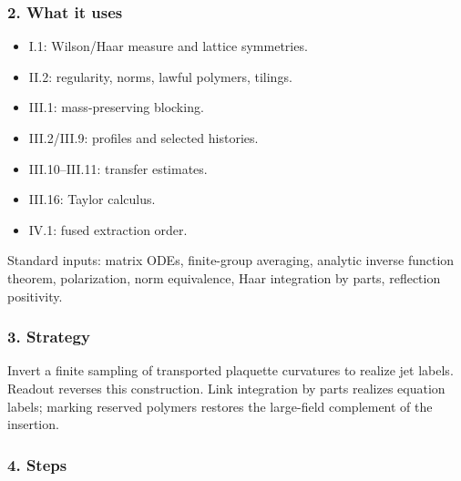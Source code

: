\documentclass[
  letterpaper,
  11pt]{article}
\providecommand{\tightlist}{%
  \setlength{\itemsep}{0pt}\setlength{\parskip}{0pt}}
\begin{document}
\subsubsection{2. What it uses}\label{what-it-uses-1}

\begin{itemize}
\tightlist
\item
  I.1: Wilson/Haar measure and lattice symmetries.
\item
  II.2: regularity, norms, lawful polymers, tilings.
\item
  III.1: mass-preserving blocking.
\item
  III.2/III.9: profiles and selected histories.
\item
  III.10--III.11: transfer estimates.
\item
  III.16: Taylor calculus.
\item
  IV.1: fused extraction order.
\end{itemize}

Standard inputs: matrix ODEs, finite-group averaging, analytic inverse
function theorem, polarization, norm equivalence, Haar integration by
parts, reflection positivity.

\subsubsection{3. Strategy}\label{strategy-1}

Invert a finite sampling of transported plaquette curvatures to realize
jet labels. Readout reverses this construction. Link integration by
parts realizes equation labels; marking reserved polymers restores the
large-field complement of the insertion.

\subsubsection{4. Steps}\label{steps-1}
\end{document}
